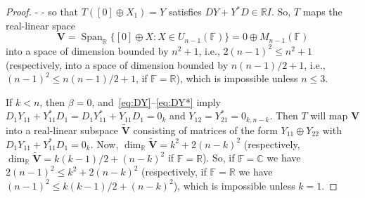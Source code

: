 \documentclass[11pt]{article}
\numberwithin{equation}{section}
\def\IF{{\mathbb F}}
\def\IC{{\mathbb C}}
\def\IR{{\mathbb R}}
\def\bV{{\mathbf V}}
\def\span{{\mathop{\mathrm{Span}}\nolimits}}
\def\bV{{\mathbf V}}
\begin{document}
\begin{proof}
-%
-%
 so that $T([0]\oplus X_1)= Y$
satisfies $DY+Y^*D \in \IR I$.
So, $T$ maps the real-linear space
$${\mathbf V} = \span_\IR \{ [0] \oplus X: X \in U_{n-1}(\IF)\}=0\oplus M_{n-1}(\IF)$$ into a space of dimension bounded by $n^2 + 1$,
i.e., $2(n-1)^2 \le n^2+1$ (respectively, into a space of dimension bounded by $n(n-1)/2 + 1$,
i.e., $(n-1)^2 \le n(n-1)/2+1$, if $\IF=\IR$), which is impossible unless $n \le 3$.

If $k < n$, then $\beta = 0$, and~\eqref{eq:DY}--\eqref{eq:DY*} imply  $D_1Y_{11} + Y_{11}^*D_1 = D_1 Y_{11}^* + Y_{11} D_1 = 0_k$
and $Y_{12} = Y_{21}^* = 0_{k,n-k}$.
Then $T$ will map $\bV$ into a real-linear subspace $\tilde \bV$ consisting of matrices of the form
$Y_{11} \oplus Y_{22}$ with $D_1Y_{11} + Y_{11}^* D_1 = 0_k$.
Now, $\dim_{\IR}\tilde \bV=k^2 + 2(n-k)^2$  (respectively, $\dim_{\IR}\tilde \bV=k(k-1)/2 + (n-k)^2$ if $\IF=\IR$).
So, if $\IF=\IC$ we have $2(n-1)^2 \le k^2+2(n-k)^2 $
(respectively, if $\IF=\IR$ we have $(n-1)^2 \le  k(k-1)/2+(n-k)^2 $), which is impossible unless $k = 1$.


\end{proof}
\end{document}

